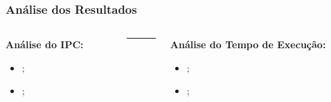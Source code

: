 \documentclass{beamer}
\begin{document}
    \begin{frame}
        \frametitle{Análise dos Resultados}

        \begin{columns}
            \begin{column}{0.5\textwidth}
                \begin{center}
                    \large
                    \textbf{Análise do IPC:}
                \end{center}
                \begin{itemize}
                    \item ;
                    \item ;
                \end{itemize}
            \end{column}

            \begin{column}{0.01\textwidth}
                \rule{.1mm}{0.6\textheight}
            \end{column}

            \begin{column}{0.5\textwidth}
                \begin{center}
                    \large
                    \textbf{Análise do Tempo de Execução:}
                \end{center}
                \begin{itemize}
                    \item ;
                    \item ;
                \end{itemize}
            \end{column}
        \end{columns}
    \end{frame}
\end{document}
